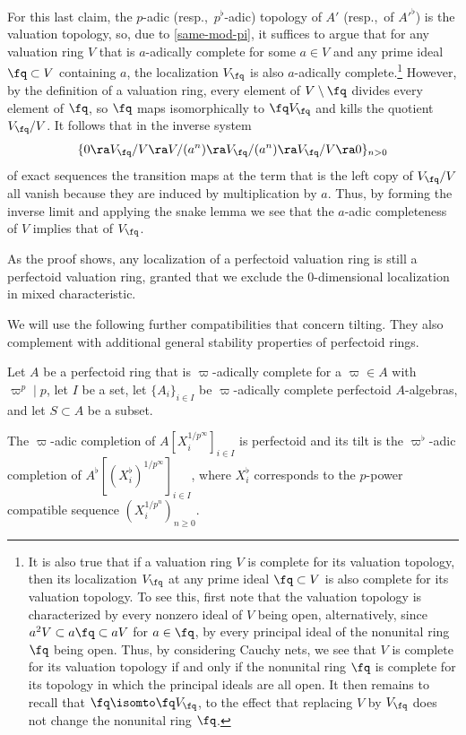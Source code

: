 For this last claim, the $p$-adic (resp.,~$p^\flat$-adic) topology of $A'$ (resp.,~of $A'^\flat$) is the valuation topology, so, due to \eqref{same-mod-pi}, it suffices to argue that for any valuation ring $V$ that is $a$-adically complete for some $a \in V$ and any prime ideal $\fq \subset V$ containing $a$, the localization $V_\fq$  is also $a$-adically complete.\footnote{
It is also true that if a valuation ring $V$ is complete for its valuation topology, then its localization $V_\fq$ at any prime ideal $\fq \subset V$ is also complete for its valuation topology. To see this, first note that the valuation topology is characterized by every nonzero ideal of $V$ being open, alternatively, since $a^2 V \subset a\fq \subset a V$ for $a \in \fq$, by every principal ideal of the nonunital ring $\fq$ being open. Thus, by considering Cauchy nets, we see that $V$ is complete for its valuation topology if and only if the nonunital ring $\fq$ is complete for its topology in which the principal ideals are all open. It then remains to recall that $\fq \isomto \fq V_\fq$, to the effect that replacing $V$ by $V_\fq$ does not change the nonunital ring $\fq$.
} However, by the definition of a valuation ring, every element of $V \setminus \fq$ divides every element of $\fq$, so $\fq$ maps isomorphically to $\fq V_\fq$ and kills the quotient $V_\fq/V$. It follows that in the inverse system
\[
\{0 \ra V_\fq/V \ra V/(a^n) \ra V_\fq/(a^n) \ra V_\fq/V \ra 0\}_{n > 0}
\]
of exact sequences the transition maps at the term that is the left copy of $V_\fq/V$ all vanish because they are induced by multiplication by $a$. Thus, by forming the inverse limit and applying the snake lemma we see that the $a$-adic completeness of $V$ implies that of $V_\fq$.
\epf


\brem
As the proof shows, any localization of a perfectoid valuation ring is still a perfectoid valuation ring, granted that we exclude the $0$-dimensional localization in mixed characteristic.
\erem





We will use the following further compatibilities that concern tilting. They also complement  with additional general stability properties of perfectoid rings.

\bprop \label{recognize}
Let $A$ be a perfectoid ring that is $\varpi$-adically complete for a $\varpi \in A$ with $\varpi^p \mid p$, let $I$ be a set, let $\{A_i \}_{i \in I}$ be  $\varpi$-adically complete perfectoid $A$-algebras, and let $S \subset A$ be a subset.
\benum
\item \label{R-0}
The $\varpi$-adic completion of $A[X_i^{1/p^\infty}]_{i \in I}$ is perfectoid and its tilt is the $\varpi^\flat$-adic completion of $A^\flat[(X_i^\flat)^{1/p^\infty}]_{i \in I}$, where $X_i^\flat$ corresponds to the $p$-power compatible sequence $(X_i^{1/p^n})_{n \ge 0}$.

